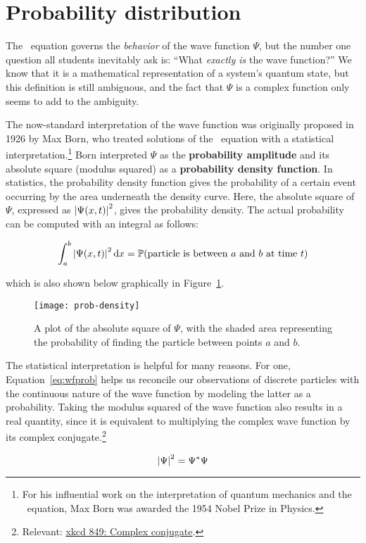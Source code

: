 \section{Probability distribution} \label{sec:prob}
The \Sch\ equation governs the \emph{behavior} of the wave function $\Psi$, but the number one question all students inevitably ask is: ``What \emph{exactly is} the wave function?'' We know that it is a mathematical representation of a system's quantum state, but this definition is still ambiguous, and the fact that $\Psi$ is a complex function only seems to add to the ambiguity. \par 

The now-standard interpretation of the wave function was originally proposed in 1926 by Max Born, who treated solutions of the \Sch\ equation with a statistical interpretation.\footnote{For his influential work on the interpretation of quantum mechanics and the \Sch\ equation, Max Born was awarded the 1954 Nobel Prize in Physics.} Born interpreted $\Psi$ as the \textbf{probability amplitude} and its absolute square (modulus squared) as a \textbf{probability density function}. In statistics, the probability density function gives the probability of a certain event occurring by the area underneath the density curve. Here, the absolute square of $\Psi$, expressed as $\abs{\Psi(x,t)}^2$, gives the probability density. The actual probability can be computed with an integral as follows:
\begin{tcolorbox}[title=Born's statistical interpretation] \vspace{-2ex}
\begin{equation}
	\int_a^b \abs{\Psi(x,t)}^2 \dd{x} = \mathbb{P}\text{(particle is between $a$ and $b$ at time $t$)} \label{eq:wfprob}
\end{equation}
\end{tcolorbox}

which is also shown below graphically in Figure~\ref{fig:wfprob}.
\begin{figure}[!h]
	\centering
	\texttt{[image: prob-density]}
	\caption{A plot of the absolute square of $\Psi$, with the shaded area representing the probability of finding the particle between points $a$ and $b$.}
	\label{fig:wfprob}
\end{figure}

The statistical interpretation is helpful for many reasons. For one, Equation~\ref{eq:wfprob} helps us reconcile our observations of discrete particles with the continuous nature of the wave function by modeling the latter as a probability. Taking the modulus squared of the wave function also results in a real quantity, since it is equivalent to multiplying the complex wave function by its complex conjugate.\footnote{Relevant: \href{https://xkcd.com/849/}{xkcd 849: Complex conjugate}.}
\begin{tcolorbox}[title=Key point: modulus squared of a complex number] \vspace{-2ex}
	\begin{equation}
		\abs{\Psi}^2 = \Psi^*\Psi
	\end{equation}
\end{tcolorbox}

